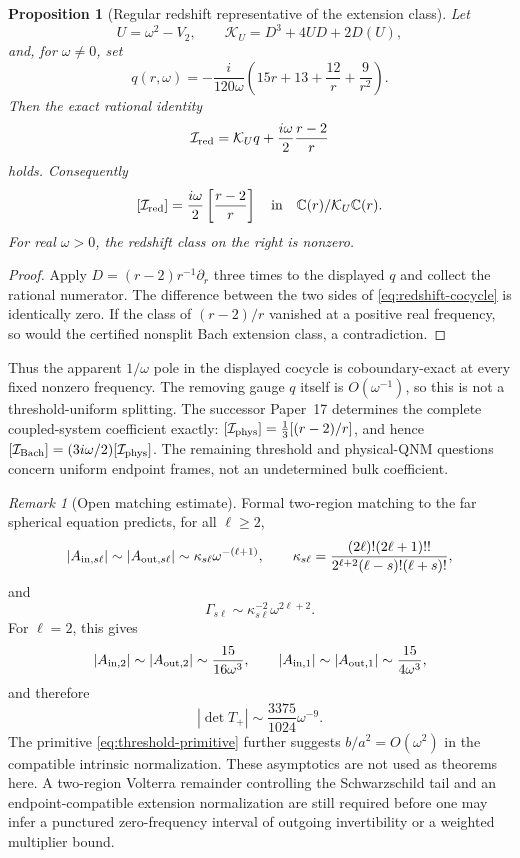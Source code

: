 \documentclass[11pt]{article}
\newtheorem{proposition}[theorem]{Proposition}
\theoremstyle{definition}
\theoremstyle{remark}
\newtheorem{remark}[theorem]{Remark}
\newcommand{\C}{\mathbb C}
\begin{document}
\begin{proposition}[Regular redshift representative of the extension class]
\label{prop:redshift-cocycle}
Let
\[
U=\omega^2-V_2,\qquad
\mathcal K_U=D^3+4UD+2D(U),
\]
and, for \(\omega\ne0\), set
\[
q(r,\omega)
=-\frac{i}{120\omega}
\left(15r+13+\frac{12}{r}+\frac9{r^2}\right).
\]
Then the exact rational identity
\begin{equation}
\label{eq:redshift-cocycle}
\mathcal I_{\rm red}
=\mathcal K_Uq+\frac{i\omega}{2}\frac{r-2}{r}
\end{equation}
holds.  Consequently
\[
[\mathcal I_{\rm red}]
=\frac{i\omega}{2}\left[\frac{r-2}{r}\right]
\quad\hbox{in}\quad
\C(r)/\mathcal K_U\C(r).
\]
For real \(\omega>0\), the redshift class on the right is nonzero.
\end{proposition}

\begin{proof}
Apply \(D=(r-2)r^{-1}\partial_r\) three times to the displayed \(q\) and
collect the rational numerator.  The difference between the two sides of
\eqref{eq:redshift-cocycle} is identically zero.  If the class of
\((r-2)/r\) vanished at a positive real frequency, so would the certified
nonsplit Bach extension class, a contradiction.
\end{proof}

Thus the apparent \(1/\omega\) pole in the displayed cocycle is
coboundary-exact at every fixed nonzero frequency.  The removing gauge
\(q\) itself is \(O(\omega^{-1})\), so this is not a threshold-uniform
splitting.  The successor Paper~17 determines the complete coupled-system
coefficient exactly:
\([\mathcal I_{\rm phys}]=\frac13[(r-2)/r]\), and hence
\([\mathcal I_{\rm Bach}]=(3i\omega/2)[\mathcal I_{\rm phys}]\).
The remaining threshold and physical-QNM questions concern uniform endpoint
frames, not an undetermined bulk coefficient.

\begin{remark}[Open matching estimate]
Formal two-region matching to the far spherical equation predicts, for all
\(\ell\ge2\),
\[
|A_{{\rm in},s\ell}|
\sim |A_{{\rm out},s\ell}|
\sim
\kappa_{s\ell}\omega^{-(\ell+1)},
\qquad
\kappa_{s\ell}
=
\frac{(2\ell)!(2\ell+1)!!}
{2^{\ell+2}(\ell-s)!(\ell+s)!},
\]
and
\[
\Gamma_{s\ell}\sim
\kappa_{s\ell}^{-2}\omega^{2\ell+2}.
\]
For \(\ell=2\), this gives
\[
|A_{{\rm in},2}|\sim |A_{{\rm out},2}|
\sim\frac{15}{16\omega^3},\qquad
|A_{{\rm in},1}|\sim |A_{{\rm out},1}|
\sim\frac{15}{4\omega^3},
\]
and therefore
\[
|\det T_+|\sim\frac{3375}{1024}\omega^{-9}.
\]
The primitive \eqref{eq:threshold-primitive} further suggests
\(b/a^2=O(\omega^2)\) in the compatible intrinsic normalization.  These
asymptotics are not used as theorems here.  A two-region Volterra remainder
controlling the Schwarzschild tail and an endpoint-compatible extension
normalization are still required before one may infer a punctured
zero-frequency interval of outgoing invertibility or a weighted multiplier
bound.
\end{remark}
\end{document}
